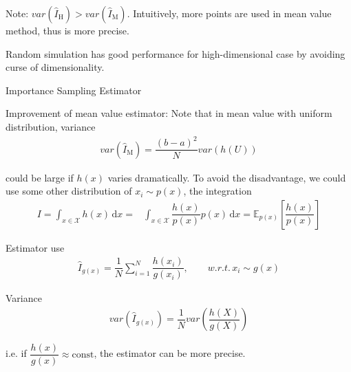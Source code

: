     Note: $ var(\hat{I}_\mathrm{H} )>var(\hat{I}_\mathrm{M} ) $. Intuitively, more points are used in mean value method, thus is more precise.

    Random simulation has good performance for high-dimensional case by avoiding curse of dimensionality.

\begin{point}
    Importance Sampling Estimator\hypertarget{StatisticalSimulationInverseTransImportanceSampli}{}
\end{point}

    Improvement of mean value estimator: Note that in mean value with uniform distribution, variance
    \begin{align}
        var(\hat{I}_\mathrm{M}) =\dfrac{(b-a)^2}{N}var(h(U))
    \end{align}

    could be large if $ h(x) $ varies dramatically. To avoid the disadvantage, we could use some other distribution of $ x_i\sim p(x) $, the integration
    \begin{align}
        I=\int_{x\in \mathcal{X} } h(x) \,\mathrm{d}x =&\int _{x\in \mathcal{X}} \dfrac{h(x)}{p(x)}p(x) \,\mathrm{d}x=\mathbb{E}_{p(x)}\left[\dfrac{h(x)}{p(x)}\right]
    \end{align}

    Estimator use 
    \begin{align}
        \hat{I}_{g(x)}=\dfrac{1}{N}\sum_{i=1}^N\dfrac{h(x_i)}{g(x_i)},\qquad w.r.t. \,x_i\sim g(x)
    \end{align}

    Variance
    \begin{align}
        var(\hat{I}_{g(x)})=\dfrac{1}{N}var\left(\dfrac{h(X)}{g(X)}\right) 
    \end{align}
    
    i.e. if $ \dfrac{h(x)}{g(x)}\approx \mathrm{const} $, the estimator can be more precise.

